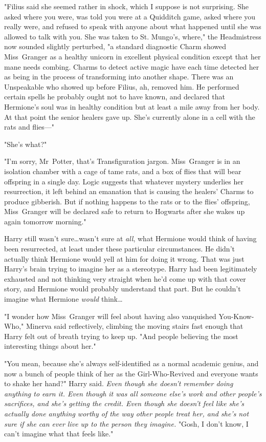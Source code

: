 "Filius said she seemed rather in shock, which I suppose is not surprising. She
asked where you were, was told you were at a Quidditch game, asked where you
really were, and refused to speak with anyone about what happened until she was
allowed to talk with you. She was taken to St. Mungo's, where," the
Headmistress now sounded slightly perturbed, "a standard diagnostic Charm
showed Miss~Granger as a healthy unicorn in excellent physical condition except
that her mane needs combing. Charms to detect active magic have each time
detected her as being in the process of transforming into another shape. There
was an Unspeakable who showed up before Filius, ah, removed him. He performed
certain spells he probably ought not to have known, and declared that
Hermione's soul was in healthy condition but at least a mile away from her
body. At that point the senior healers gave up. She's currently alone in a cell
with the rats and flies---"

"She's what?"

"I'm sorry, Mr~Potter, that's Transfiguration jargon. Miss~Granger is in an
isolation chamber with a cage of tame rats, and a box of flies that will bear
offspring in a single day. Logic suggests that whatever mystery underlies her
resurrection, it left behind an emanation that is causing the healers' Charms
to produce gibberish. But if nothing happens to the rats or to the flies'
offspring, Miss~Granger will be declared safe to return to Hogwarts after she
wakes up again tomorrow morning."

Harry still wasn't sure…wasn't sure at \emph{all}, what Hermione would
think of having been resurrected, at least under these particular
circumstances. He didn't actually think Hermione would yell at him for doing it
wrong. That was just Harry's brain trying to imagine her as a stereotype. Harry
had been legitimately exhausted and not thinking very straight when he'd come
up with that cover story, and Hermione would probably understand that part. But
he couldn't imagine what Hermione \emph{would} think…

"I wonder how Miss~Granger will feel about having also vanquished
You-Know-Who," Minerva said reflectively, climbing the moving stairs fast
enough that Harry felt out of breath trying to keep up. "And people believing
the most interesting things about her."

"You mean, because she's always self-identified as a normal academic genius,
and now a bunch of people think of her as the Girl-Who-Revived and everyone
wants to shake her hand?" Harry said. \emph{Even though she doesn't remember
doing anything to earn it. Even though it was all someone else's work and other
people's sacrifices, and she's getting the credit. Even though she doesn't feel
like she's actually done anything worthy of the way other people treat her, and
she's not sure if she can ever live up to the person they imagine.} "Gosh, I
don't know, I can't imagine what that feels like."


